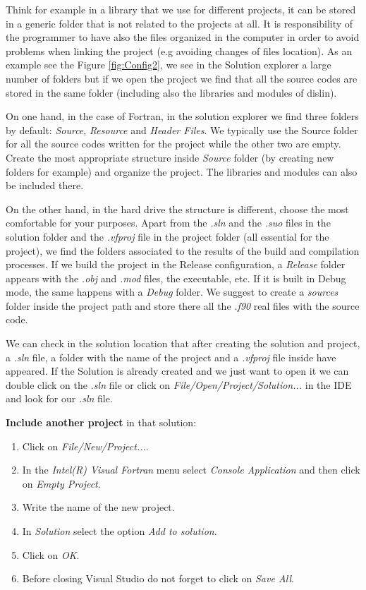 Think for example in a library that we use for different projects, it can be stored in a generic folder that is not related to the projects at all. It is responsibility of the programmer to have also the files organized in the computer in order to avoid problems when linking the project (e.g avoiding changes of files location). As an example see the Figure \ref{fig:Config2}, we see in the Solution explorer a large number of folders but if we open the project we find that all the source codes are stored in the same folder (including also the libraries and modules of dislin).

On one hand, in the case of Fortran, in the solution explorer we find three folders by default: \textit{Source}, \textit{Resource} and \textit{Header Files}. We typically use the Source folder for all the source codes written for the project while the other two are empty. Create the most appropriate structure inside \textit{Source} folder (by creating new folders for example) and organize the project. The libraries and modules can also be included there. 

On the other hand, in the hard drive the structure is different, choose the most comfortable for your purposes. Apart from the \textit{.sln} and the \textit{.suo} files in the solution folder and the \textit{.vfproj} file in the project folder (all essential for the project), we find the folders associated to the results of the build and compilation processes. If we build the project in the Release configuration, a \textit{Release} folder appears with the \textit{.obj} and \textit{.mod} files, the executable, etc. If it is built in Debug mode, the same happens with a \textit{Debug} folder. We suggest to create a \textit{sources} folder inside the project path and store there all the \textit{.f90} real files with the source code.

We can check in the solution location that after creating the solution and project, a \textit{.sln} file, a folder with the name of the project and a \textit{.vfproj} file inside have appeared. If the Solution is already created and we just want to open it we can double click on the \textit{.sln} file or click on \textit{File/Open/Project/Solution...} in the IDE and look for our \textit{.sln} file. 

\textbf{Include another project} in that solution:
\begin{enumerate}[nosep]
    \item Click on \textit{File/New/Project...}.
    \item In the \textit{Intel(R) Visual Fortran} menu select \textit{Console Application} and then click on \textit{Empty Project}.
    \item Write the name of the new project.
    \item In \textit{Solution} select the option \textit{Add to solution}.
    \item Click on \textit{OK}.
    \item Before closing Visual Studio do not forget to click on \textit{Save All}.
\end{enumerate}
    
